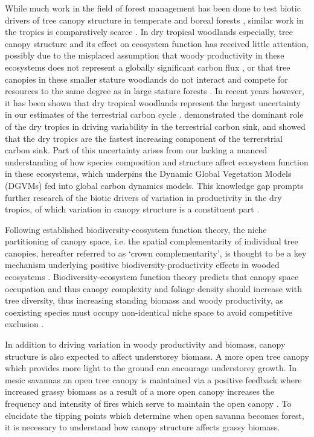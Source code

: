 \documentclass[11pt,a4paper]{article}
\begin{document}
While much work in the field of forest management has been done to test biotic drivers of tree canopy structure in temperate and boreal forests \citep{}, similar work in the tropics is comparatively scarce \citep{}. In dry tropical woodlands especially, tree canopy structure and its effect on ecosystem function has received little attention, possibly due to the misplaced assumption that woody productivity in these ecosystems does not represent a globally significant carbon flux \citep{}, or that tree canopies in these smaller stature woodlands do not interact and compete for resources to the same degree as in large stature forests \citep{}. In recent years however, it has been shown that dry tropical woodlands represent the largest uncertainty in our estimates of the terrestrial carbon cycle \citep{Quere2018, Ahlstrom2015}. \citet{Sitch2015} demonstrated the dominant role of the dry tropics in driving variability in the terrestrial carbon sink, and showed that the dry tropics are the fastest increasing component of the terrerstrial carbon sink. Part of this uncertainty arises from our lacking a nuanced understanding of how species composition and structure affect ecosystem function in these ecosystems, which underpins the Dynamic Global Vegetation Models (DGVMs) fed into global carbon dynamics models. This knowledge gap prompts further research of the biotic drivers of variation in productivity in the dry tropics, of which variation in canopy structure is a constituent part \citep{}.

Following established biodiversity-ecosystem function theory, the niche partitioning of canopy space, i.e. the spatial complementarity of individual tree canopies, hereafter referred to as `crown complementarity', is thought to be a key mechanism underlying positive biodiversity-productivity effects in wooded ecosystems \citep{Pretzsch2014, Barry2019}. Biodiversity-ecosystem function theory predicts that canopy space occupation and thus canopy complexity and foliage density should increase with tree diversity, thus increasing standing biomass and woody productivity, as coexisting species must occupy non-identical niche space to avoid competitive exclusion \citep{}. 

In addition to driving variation in woody productivity and biomass, canopy structure is also expected to affect understorey biomass. A more open tree canopy which provides more light to the ground can encourage understorey growth. In mesic savannas an open tree canopy is maintained via a positive feedback where increased grassy biomass as a result of a more open canopy increases the frequency and intensity of fires which serve to maintain the open canopy \citep{}. To elucidate the tipping points which determine when open savanna becomes forest, it is necessary to understand how canopy structure affects grassy biomass.
\end{document}
